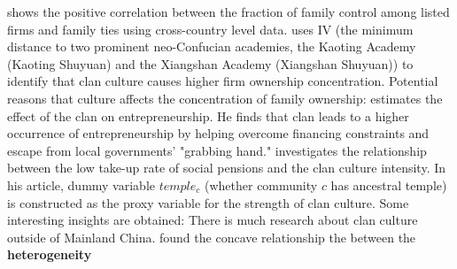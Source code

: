 \documentclass[12pt]{report}
\begin{document}
\cite{bertrand2006role} shows the positive correlation between the fraction of family control among listed firms and family
ties using cross-country level data.
\cite{cheng2021clan} uses IV (the minimum distance to two prominent neo-Confucian academies,
the Kaoting Academy (Kaoting Shuyuan) and the Xiangshan Academy (Xiangshan Shuyuan)) to identify that
clan culture causes higher firm ownership concentration.
Potential reasons that culture affects the concentration of family ownership:
\cite{zhang2020clans} estimates the effect of the clan on entrepreneurship. He finds that clan leads to a higher
occurrence of entrepreneurship by helping overcome financing constraints and escape from local governments' "grabbing hand."
\cite{zhang2019family} investigates the relationship between the low take-up rate of social pensions and the clan culture intensity. In
his article, dummy variable $temple_c$ (whether community $c$ has ancestral temple) is constructed as the proxy variable for the strength of clan
culture. Some interesting insights are obtained:
\cite{cao2022clans}
There is much research about clan culture outside of Mainland China. \cite{yang2019family} found the concave relationship the between the \textbf{heterogeneity}
\end{document}
